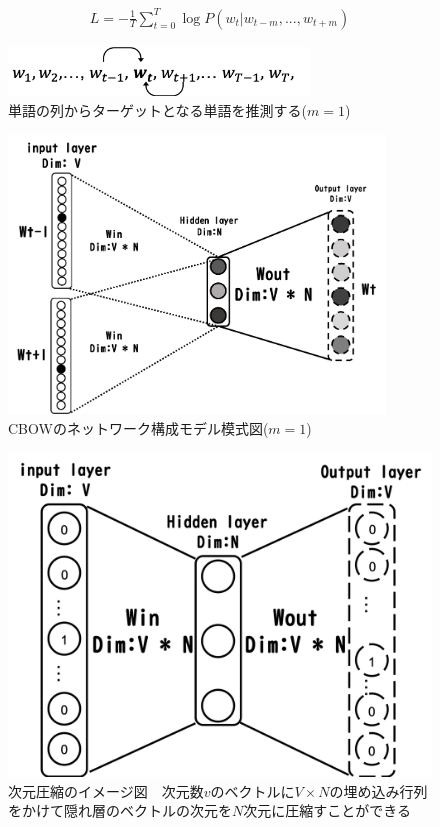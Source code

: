 \documentclass[a4j,11pt,report]{jsbook}
\begin{document}
\begin{equation}
  \label{cbow_loss}
  \begin{array}{c}
    L = -\frac{1}{T} \sum_{t = 0}^T \log P(w_{t}|w_{t-m},...,w_{t+m})
  \end{array}
\end{equation}

\begin{figure}[H]
  \centering
  \includegraphics[width = 80mm]{image/cbow_w1w2wt-1wtwt+1.png}
  \caption{単語の列からターゲットとなる単語を推測する($m = 1$)}
  \label{fig:CBOWformula}
\end{figure}

\begin{figure}[H]
  \centering
  \includegraphics[width = 100mm]{image/CBOW_windowsize_1.png}
  \caption{CBOWのネットワーク構成モデル模式図($ m = 1$) }
  \label{fig:CBOWimage}
\end{figure}



\begin{figure}[H]
  \centering
  \includegraphics[scale = 0.5]{image/CBOW_image.png}
  \caption{次元圧縮のイメージ図　次元数$v$のベクトルに$V \times N $の埋め込み行列をかけて隠れ層のベクトルの次元を$N$次元に圧縮すことができる}
  \label{fig:CBOWimage}
\end{figure}
\fi
\end{document}
